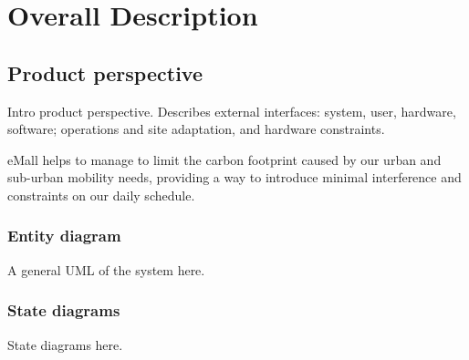 \section{Overall Description}

\subsection{Product perspective}
Intro product perspective. Describes external interfaces: system,
user, hardware, software;
operations and site adaptation, and
hardware constraints.

eMall helps to manage to limit the carbon footprint caused by our urban and sub-urban mobility needs,
providing a way to introduce minimal interference and constraints on our daily schedule.

\subsubsection{Entity diagram}
A general UML of the system here.

\subsubsection{State diagrams}
State diagrams here.

